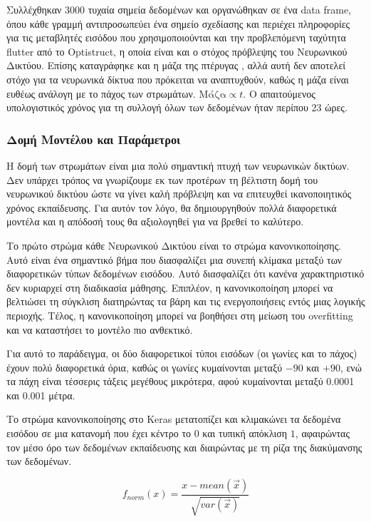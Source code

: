 Συλλέχθηκαν 3000 τυχαία σημεία δεδομένων και οργανώθηκαν σε ένα \textlatin{data frame}, όπου κάθε γραμμή αντιπροσωπεύει ένα σημείο σχεδίασης και περιέχει πληροφορίες για τις μεταβλητές εισόδου που χρησιμοποιούνται και την προβλεπόμενη ταχύτητα \textlatin{flutter} από το \textlatin{Optistruct}, η οποία είναι και ο στόχος πρόβλεψης του Νευρωνικού Δικτύου. Επίσης καταγράφηκε και η μάζα της πτέρυγας , αλλά αυτή δεν αποτελεί στόχο για τα νευρωνικά δίκτυα που πρόκειται να αναπτυχθούν, καθώς η μάζα είναι ευθέως ανάλογη με το πάχος των στρωμάτων. \(\text{Μάζα} \propto t\). Ο απαιτούμενος υπολογιστικός χρόνος για τη συλλογή όλων των δεδομένων ήταν περίπου 23 ώρες.

\subsubsection{Δομή Μοντέλου και Παράμετροι}

Η δομή των στρωμάτων είναι μια πολύ σημαντική πτυχή των νευρωνικών δικτύων. Δεν υπάρχει τρόπος να γνωρίζουμε εκ των προτέρων τη βέλτιστη δομή του νευρωνικού δικτύου ώστε να γίνει καλή πρόβλεψη και να επιτευχθεί ικανοποιητικός χρόνος εκπαίδευσης. Για αυτόν τον λόγο, θα δημιουργηθούν πολλά διαφορετικά μοντέλα και η απόδοσή τους θα αξιολογηθεί για να βρεθεί το καλύτερο.

Το πρώτο στρώμα κάθε Νευρωνικού Δικτύου είναι το στρώμα κανονικοποίησης. Αυτό είναι ένα σημαντικό βήμα που διασφαλίζει μια συνεπή κλίμακα μεταξύ των διαφορετικών τύπων δεδομένων εισόδου. Αυτό διασφαλίζει ότι κανένα χαρακτηριστικό δεν κυριαρχεί στη διαδικασία μάθησης. Επιπλέον, η κανονικοποίηση μπορεί να βελτιώσει τη σύγκλιση διατηρώντας τα βάρη και τις ενεργοποιήσεις εντός μιας λογικής περιοχής. Τέλος, η κανονικοποίηση μπορεί να βοηθήσει στη μείωση του \textlatin{overfitting} και να καταστήσει το μοντέλο πιο ανθεκτικό.

Για αυτό το παράδειγμα, οι δύο διαφορετικοί τύποι εισόδων (οι γωνίες και το πάχος) έχουν πολύ διαφορετικά όρια, καθώς οι γωνίες κυμαίνονται μεταξύ $-90$ και $+90$, ενώ τα πάχη είναι τέσσερις τάξεις μεγέθους μικρότερα, αφού κυμαίνονται μεταξύ 0.0001 και 0.001 μέτρα.

Το στρώμα κανονικοποίησης στο \textlatin{Keras} μετατοπίζει και κλιμακώνει τα δεδομένα εισόδου σε μια κατανομή που έχει κέντρο το 0 και τυπική απόκλιση $1$, αφαιρώντας τον μέσο όρο των δεδομένων εκπαίδευσης και διαιρώντας με τη ρίζα της διακύμανσης των δεδομένων.


\begin{equation}
f_{norm}(x) = \frac{x - mean\left( \overrightarrow{x} \right)}{\sqrt{var\left( \overrightarrow{x} \right)}}
\end{equation}

